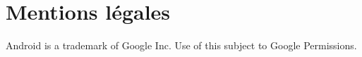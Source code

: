 \documentclass[a4paper,11pt,french]{article}
\begin{document}








\section{Mentions légales}
Android is a trademark of Google Inc. Use of this subject to Google Permissions.
\end{document}
